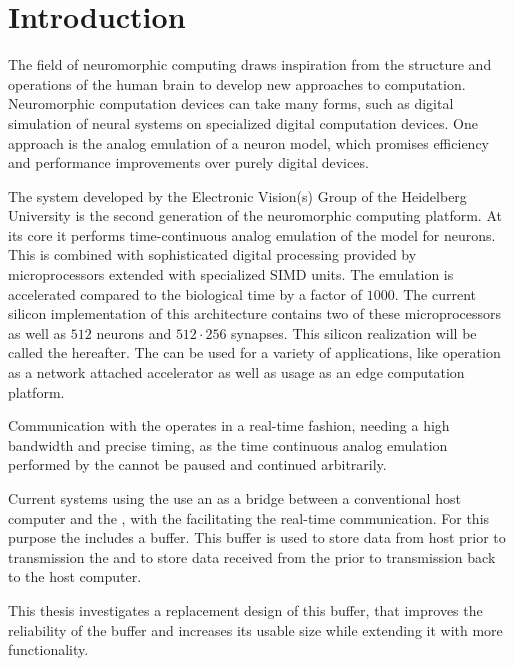 \section{Introduction}
The field of neuromorphic computing draws inspiration from the structure and operations of the human brain to develop new approaches to computation. Neuromorphic computation devices can take many forms, such as digital simulation of neural systems on specialized digital computation devices\autocite{ref:spinnaker}. One approach is the analog emulation of a neuron model, which promises efficiency and performance improvements over purely digital devices.

The \BSSTwo{} system\autocite{ref:bss2hw} developed by the Electronic Vision(s) Group of the Heidelberg University is the second generation of the \BSS{} neuromorphic computing platform. At its core it performs time-continuous analog emulation of the \AdEx{}\autocite{ref:adex} model for neurons. This is combined with sophisticated digital processing provided by microprocessors extended with specialized SIMD units. The emulation is accelerated compared to the biological time by a factor of $\num{1000}$. The current silicon implementation of this architecture contains two of these microprocessors as well as $\num{512}$ neurons and $\num{512} · \num{256}$ synapses. This silicon realization will be called the \HICANNX{} hereafter. The \HICANNX{} \ASIC{} can be used for a variety of applications, like operation as a network attached accelerator\autocite{ref:network_accelerator} as well as usage as an edge computation platform\autocite{ref:mobile_system}.

Communication with the \HICANNX{} \ASIC{} operates in a real-time fashion, needing a high bandwidth and precise timing, as the time continuous analog emulation performed by the \ASIC{} cannot be paused and continued arbitrarily.

Current systems using the \HICANNX{} \ASIC{} use an \FPGA{} as a bridge between a conventional host computer and the \ASIC{}, with the \FPGA{} facilitating the real-time communication. For this purpose the \FPGA{} includes a buffer. This buffer is used to store data from host prior to transmission the \ASIC{} and to store data received from the \ASIC{} prior to transmission back to the host computer.

This thesis investigates a replacement design of this buffer, that improves the reliability of the buffer and increases its usable size while extending it with more functionality.
